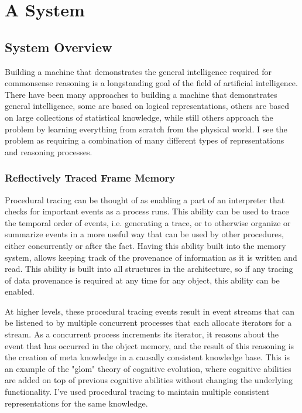 \chapter{A System}\label{ch:a_system}

\section{System Overview}

Building a machine that demonstrates the general intelligence required
for commonsense reasoning is a longstanding goal of the field of
artificial intelligence.  There have been many approaches to building
a machine that demonstrates general intelligence, some are based on
logical representations, others are based on large collections of
statistical knowledge, while still others approach the problem by
learning everything from scratch from the physical world.  I see the
problem as requiring a combination of many different types of
representations and reasoning processes.



\subsection{Reflectively Traced Frame Memory}

Procedural tracing can be thought of as enabling a part of an
interpreter that checks for important events as a process runs.  This
ability can be used to trace the temporal order of events, i.e.
generating a trace, or to otherwise organize or summarize events in a
more useful way that can be used by other procedures, either
concurrently or after the fact.  Having this ability built into the
memory system, allows keeping track of the provenance of information as
it is written and read.  This ability is built into all structures in
the architecture, so if any tracing of data provenance is required at
any time for any object, this ability can be enabled.

At higher levels, these procedural tracing events result in event
streams that can be listened to by multiple concurrent processes that
each allocate iterators for a stream.  As a concurrent process
increments its iterator, it reasons about the event that has occurred
in the object memory, and the result of this reasoning is the creation
of meta knowledge in a causally consistent knowledge base.  This is an
example of the "glom" theory of cognitive evolution, where cognitive
abilities are added on top of previous cognitive abilities without
changing the underlying functionality.  I've used procedural tracing
to maintain multiple consistent representations for the same
knowledge.

